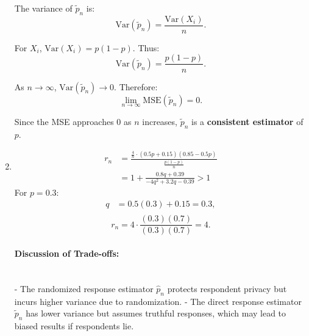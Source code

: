 \documentclass[12pt,letterpaper, onecolumn]{exam}
\begin{document}
\begin{questions}
\begin{solution}
\begin{enumerate}
        The variance of \(\tilde{p}_n\) is:
        \[
        \mathrm{Var}(\tilde{p}_n) = \frac{\mathrm{Var}(X_i)}{n}.
        \]
        
        For \(X_i\), \(\mathrm{Var}(X_i) = p(1-p)\). Thus:
        \[
        \mathrm{Var}(\tilde{p}_n) = \frac{p(1-p)}{n}.
        \]
        
        As \(n \to \infty\), \(\mathrm{Var}(\tilde{p}_n) \to 0\). Therefore:
        \[
        \lim_{n \to \infty} \mathrm{MSE}(\tilde{p}_n) = 0.
        \]
        
        Since the MSE approaches 0 as \(n\) increases, \(\tilde{p}_n\) is a \textbf{consistent estimator} of \(p\).
             \item \begin{align*}
                 r_n & = \frac{\frac{4}{n} \cdot (0.5p + 0.15)(0.85 - 0.5p)}{ \frac{p(1-p)}{n}} \\
                 & = 1+\frac{0.8q+0.39}{-4q^2+3.2q-0.39} >1
             \end{align*}
            For \(p = 0.3\):
        \begin{align*}
        q &= 0.5(0.3) + 0.15 = 0.3, \\
        \end{align*}
        \[
        r_n = 4 \cdot \frac{(0.3)(0.7)}{(0.3)(0.7)} = 4.
        \]
        
        \paragraph{Discussion of Trade-offs:} \\
        - The randomized response estimator \(\hat{p}_n\) protects respondent privacy but incurs higher variance due to randomization.
        - The direct response estimator \(\tilde{p}_n\) has lower variance but assumes truthful responses, which may lead to biased results if respondents lie.
     \end{enumerate}
     \end{solution}
\end{questions}
\end{document}
